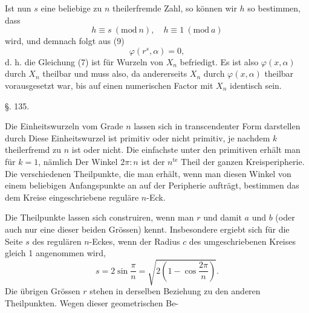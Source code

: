 
Ist nun $s$ eine beliebige zu $n$ theilerfremde Zahl, so können wir $h$ so bestimmen, dass
\[
h \equiv s \ (\mathrm{mod}\ n), \quad h \equiv 1 \ (\mathrm{mod}\ a)
\]
wird, und demnach folgt aus (9)
\[
\varphi(r^s, \alpha) = 0,
\]
d. h. die Gleichung (7) ist für  Wurzeln von $X_n$ befriedigt. Es ist also $\varphi(x,\alpha)$ durch $X_n$ theilbar und muss also, da andererseits $X_n$ durch $\varphi(x,\alpha)$ theilbar vorausgesetzt war, bis auf einen numerischen Factor mit $X_n$ identisch sein.

\begin{center}
§. 135.

\end{center}

Die Einheitswurzeln vom Grade $n$ lassen sich in transcendenter Form darstellen durch
Diese Einheitswurzel ist primitiv oder nicht primitiv, je nachdem $k$ theilerfremd zu $n$ ist oder nicht. Die einfachste unter den primitiven erhält man für $k = 1$, nämlich
Der Winkel $2\pi : n$ ist der $n^{\text{te}}$ Theil der ganzen Kreisperipherie. Die verschiedenen Theilpunkte, die man erhält, wenn man diesen Winkel von einem beliebigen Anfangspunkte an auf der Peripherie aufträgt, bestimmen das dem Kreise eingeschriebene reguläre $n$-Eck.


Die Theilpunkte lassen sich construiren, wenn man $r$ und damit $a$ und $b$ (oder auch nur eine dieser beiden Grössen) kennt. Insbesondere ergiebt sich für die Seite $s$ des regulären $n$-Eckes, wenn der Radius $c$ des umgeschriebenen Kreises gleich 1 angenommen wird,
\[
s = 2 \sin\frac{\pi}{n} = \sqrt{2\left(1 - \cos\frac{2\pi}{n}\right)}.
\]
Die übrigen Grössen $r$ stehen in derselben Beziehung zu den anderen Theilpunkten. Wegen dieser geometrischen Be-
